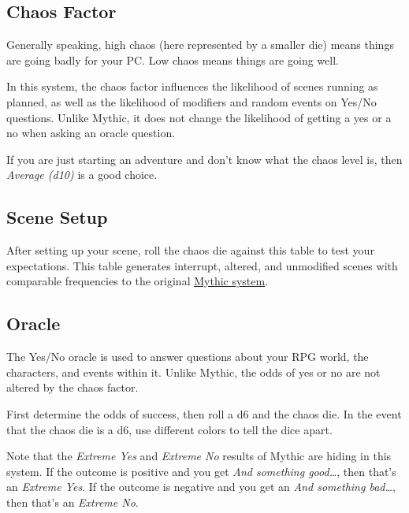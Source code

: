 \begin{multicols}{2}
\clearfloat{}

\subsection{Chaos Factor}
Generally speaking, high chaos (here represented by a smaller die) means things
are going badly for your PC\@. Low chaos means things are going well.

In this system, the chaos factor influences the likelihood of scenes running as
planned, as well as the likelihood of modifiers and random events on Yes/No
questions. Unlike Mythic, it does not change the likelihood of getting a yes or
a no when asking an oracle question.

If you are just starting an adventure and don't know what the chaos level is,
then \emph{Average (d10)} is a good choice.



\subsection{Scene Setup}
After setting up your scene, roll the chaos die against this table to test your
expectations. This table generates interrupt, altered, and unmodified scenes
with comparable frequencies to the original
\href{https://www.wordmillgames.com/mythic-gme.html}{Mythic system}.


\subsection{Oracle}
The Yes/No oracle is used to answer questions about your RPG world, the
characters, and events within it. Unlike Mythic, the odds of yes or no are not
altered by the chaos factor.

First determine the odds of success, then roll a d6 and the chaos die. In the
event that the chaos die is a d6, use different colors to tell the dice apart.

Note that the \emph{Extreme Yes} and \emph{Extreme No} results of Mythic are
hiding in this system. If the outcome is positive and you get \emph{And
something good\ldots}, then that's an \emph{Extreme Yes}. If the outcome is
negative and you get an \emph{And something bad\ldots}, then that's an
\emph{Extreme No}.



\vfill
\end{multicols}

